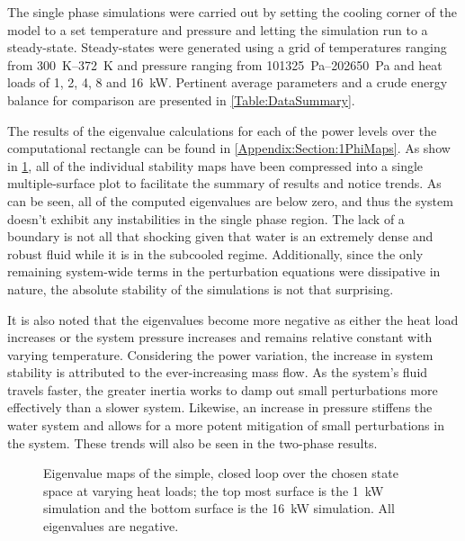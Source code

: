 The single phase simulations were carried out by setting the cooling corner of the model to a set temperature and pressure and letting the simulation run to a steady-state.
Steady-states were generated using a grid of temperatures ranging from \SIrange{300}{372}{\kelvin} and pressure ranging from \SIrange{101325}{202650}{\pascal} and heat loads of \num{1}, \num{2}, \num{4}, \num{8} and \SI{16}{\kW}.
Pertinent average parameters and a crude energy balance for comparison are presented in \cref{Table:DataSummary}.


The results of the eigenvalue calculations for each of the power levels over the computational rectangle can be found in \cref{Appendix:Section:1PhiMaps}.
As show in \cref{Simulations:Figure:AllEigMap}, all of the individual stability maps have been compressed into a single multiple-surface plot to facilitate the summary of results and notice trends.
As can be seen, all of the computed eigenvalues are below zero, and thus the system doesn't exhibit any instabilities in the single phase region.
The lack of a boundary is not all that shocking given that water is an extremely dense and robust fluid while it is in the subcooled regime.
Additionally, since the only remaining system-wide terms in the perturbation equations were dissipative in nature, the absolute stability of the simulations is not that surprising.

It is also noted that the eigenvalues become more negative as either the heat load increases or the system pressure increases and remains relative constant with varying temperature.
Considering the power variation, the increase in system stability is attributed to the ever-increasing mass flow.  As the system's fluid travels faster, the greater inertia works to damp out small perturbations more effectively than a slower system.
Likewise, an increase in pressure stiffens the water system and allows for a more potent mitigation of small perturbations in the system.
These trends will also be seen in the two-phase results.

\begin{figure}%
    \centering
    \caption{Eigenvalue maps of the simple, closed loop over the chosen state space at varying heat loads; the top most surface is the \SI{1}{\kW} simulation and the bottom surface is the \SI{16}{\kW} simulation. All eigenvalues are negative.}%
    \label{Simulations:Figure:AllEigMap}
\end{figure}


